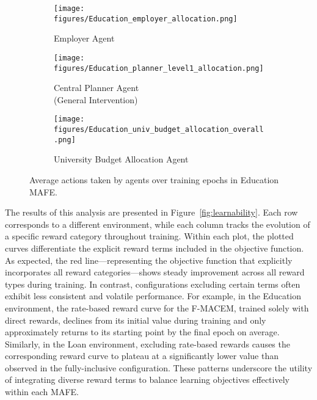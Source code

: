 \begin{figure*}[ht!]    
  \hspace{0.6cm}
  \begin{subfigure}{0.28\textwidth}
    \texttt{[image: figures/Education\_employer\_allocation.png]}
    \caption{Employer Agent} \label{fig:Education_employer_allocation_body}
    \vspace{0.34cm}
  \end{subfigure}%
  \hspace{0.25cm}
  \begin{subfigure}{0.28\textwidth}
    \texttt{[image: figures/Education\_planner\_level1\_allocation.png]}
    \caption{Central Planner Agent \\ (General Intervention)} \label{fig:Education_planner_level1_allocation_body}
  \end{subfigure}%
  \hspace{0.25cm}
  \begin{subfigure}{0.28\textwidth}
    \texttt{[image: figures/Education\_univ\_budget\_allocation\_overall.png]}
    \caption{University Budget Allocation Agent} \label{fig:Education_univ_budget_allocation_body}
    \vspace{-0.0cm}
  \end{subfigure}%

\caption{Average actions taken by agents over training epochs in Education MAFE.} \label{fig:education_action_summary}
\vspace{-3mm}
\end{figure*}

The results of this analysis are presented in Figure~\ref{fig:learnability}. Each row corresponds to a different environment, while each column tracks the evolution of a specific reward category throughout training. Within each plot, the plotted curves differentiate the explicit reward terms included in the objective function. As expected, the red line---representing the objective function that explicitly incorporates all reward categories---shows steady improvement across all reward types during training. In contrast, configurations excluding certain terms often exhibit less consistent and volatile performance. For example, in the Education environment, the rate-based reward curve for the F-MACEM, trained solely with direct rewards, declines from its initial value during training and only approximately returns to its starting point by the final epoch on average. Similarly, in the Loan environment, excluding rate-based rewards causes the corresponding reward curve to plateau at a significantly lower value than observed in the fully-inclusive configuration. These patterns underscore the utility of integrating diverse reward terms to balance learning objectives effectively within each MAFE.

